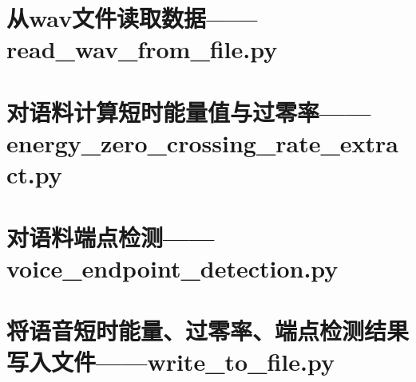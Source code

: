 \documentclass{hitreport}
\begin{document}

\newpage
\begin{appendices}

\section{从wav文件读取数据——read\_wav\_from\_file.py}



\section{对语料计算短时能量值与过零率——energy\_zero\_crossing\_rate\_extract.py}



\section{对语料端点检测——voice\_endpoint\_detection.py}



\section{将语音短时能量、过零率、端点检测结果写入文件——write\_to\_file.py}



\end{appendices}
\end{document}

